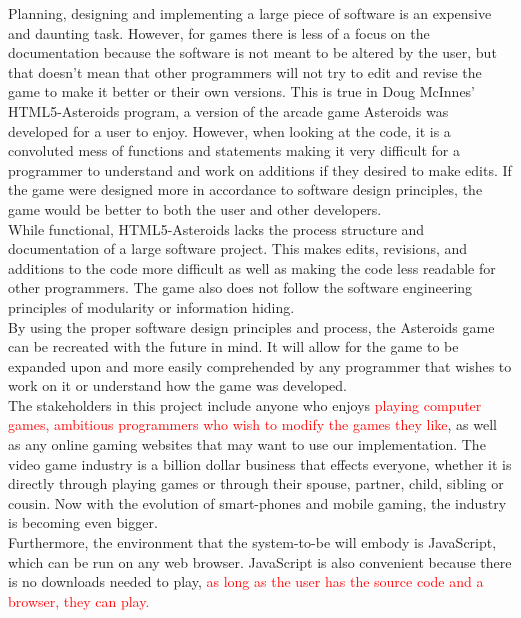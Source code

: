 \documentclass{article}
\begin{document}
Planning, designing and implementing a large piece of software is an expensive and daunting task. However, for games there is less of a focus on the documentation because the software is not meant to be altered by the user, but that doesn't mean that other programmers will not try to edit and revise the game to make it better or their own versions. This is true in Doug McInnes' HTML5-Asteroids program, a version of the arcade game Asteroids was developed for a user to enjoy. However, when looking at the code, it is a convoluted mess of functions and statements making it very difficult for a programmer to understand and work on additions if they desired to make edits. If the game were designed more in accordance to software design principles, the game would be better to both the user and other developers.\\
While functional, HTML5-Asteroids lacks the process structure and documentation of a large software project. This makes edits, revisions, and additions to the code more difficult as well as making the code less readable for other programmers. The game also does not follow the software engineering principles of modularity or information hiding.\\
By using the proper software design principles and process, the Asteroids game can be recreated with the future in mind. It will allow for the game to be expanded upon and more easily comprehended by any programmer that wishes to work on it or understand how the game was developed.\\
The stakeholders in this project include anyone who enjoys \textcolor{red}{playing computer games, ambitious programmers who wish to modify the games they like}, as well as any online gaming websites that may want to use our implementation. The video game industry is a billion dollar business that effects everyone, whether it is directly through playing games or through their spouse, partner, child, sibling or cousin. Now with the evolution of smart-phones and mobile gaming, the industry is becoming even bigger.\\
Furthermore, the environment that the system-to-be will embody is JavaScript, which can be run on any web browser. JavaScript is also convenient because there is no downloads needed to play, \textcolor{red}{as long as the user has the source code and a browser, they can play.}\\





\end{document}
